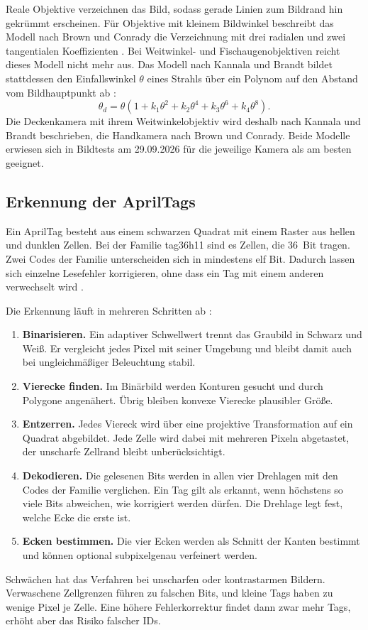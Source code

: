 Reale Objektive verzeichnen das Bild, sodass gerade Linien zum Bildrand hin gekrümmt erscheinen. Für Objektive mit kleinem Bildwinkel beschreibt das Modell nach Brown und Conrady die Verzeichnung mit drei radialen und zwei tangentialen Koeffizienten \cite{Brown1966}. Bei Weitwinkel- und Fischaugenobjektiven reicht dieses Modell nicht mehr aus. Das Modell nach Kannala und Brandt bildet stattdessen den Einfallswinkel $\theta$ eines Strahls über ein Polynom auf den Abstand vom Bildhauptpunkt ab \cite{Kannala2006}:
\begin{equation}
    \theta_d = \theta \left(1 + k_1 \theta^2 + k_2 \theta^4 + k_3 \theta^6 + k_4 \theta^8\right).
    \label{eq:bv-kannala}
\end{equation}
Die Deckenkamera mit ihrem Weitwinkelobjektiv wird deshalb nach Kannala und Brandt beschrieben, die Handkamera nach Brown und Conrady. Beide Modelle erwiesen sich in Bildtests am 29.09.2026 für die jeweilige Kamera als am besten geeignet. 

\subsection{Erkennung der AprilTags}
\label{subsec:bv-erkennung}
Ein AprilTag besteht aus einem schwarzen Quadrat mit einem Raster aus hellen und dunklen Zellen. Bei der Familie tag36h11 sind es  Zellen, die 36~Bit tragen. Zwei Codes der Familie unterscheiden sich in mindestens elf Bit. Dadurch lassen sich einzelne Lesefehler korrigieren, ohne dass ein Tag mit einem anderen verwechselt wird \cite{Olson2011,Wang2016}.

Die Erkennung läuft in mehreren Schritten ab \cite{GarridoJurado2014}:
\begin{enumerate}
    \item \textbf{Binarisieren.} Ein adaptiver Schwellwert trennt das Graubild in Schwarz und Weiß. Er vergleicht jedes Pixel mit seiner Umgebung und bleibt damit auch bei ungleichmäßiger Beleuchtung stabil.
    \item \textbf{Vierecke finden.} Im Binärbild werden Konturen gesucht und durch Polygone angenähert. Übrig bleiben konvexe Vierecke plausibler Größe.
    \item \textbf{Entzerren.} Jedes Viereck wird über eine projektive Transformation auf ein Quadrat abgebildet. Jede Zelle wird dabei mit mehreren Pixeln abgetastet, der unscharfe Zellrand bleibt unberücksichtigt.
    \item \textbf{Dekodieren.} Die gelesenen Bits werden in allen vier Drehlagen mit den Codes der Familie verglichen. Ein Tag gilt als erkannt, wenn höchstens so viele Bits abweichen, wie korrigiert werden dürfen. Die Drehlage legt fest, welche Ecke die erste ist.
    \item \textbf{Ecken bestimmen.} Die vier Ecken werden als Schnitt der Kanten bestimmt und können optional subpixelgenau verfeinert werden.
\end{enumerate}
Schwächen hat das Verfahren bei unscharfen oder kontrastarmen Bildern. Verwaschene Zellgrenzen führen zu falschen Bits, und kleine Tags haben zu wenige Pixel je Zelle. Eine höhere Fehlerkorrektur findet dann zwar mehr Tags, erhöht aber das Risiko falscher IDs.


